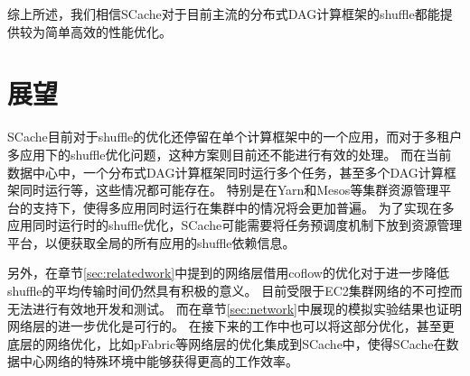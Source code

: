 综上所述，我们相信SCache对于目前主流的分布式DAG计算框架的shuffle都能提供较为简单高效的性能优化。

\section{展望}

SCache目前对于shuffle的优化还停留在单个计算框架中的一个应用，而对于多租户多应用下的shuffle优化问题，这种方案则目前还不能进行有效的处理。
而在当前数据中心中，一个分布式DAG计算框架同时运行多个任务，甚至多个DAG计算框架同时运行等，这些情况都可能存在。
特别是在Yarn\cite{yarn}和Mesos\cite{mesos}等集群资源管理平台的支持下，使得多应用同时运行在集群中的情况将会更加普遍。
为了实现在多应用同时运行时的shuffle优化，SCache可能需要将任务预调度机制下放到资源管理平台，以便获取全局的所有应用的shuffle依赖信息。

另外，在章节\ref{sec:relatedwork}中提到的网络层借用coflow的优化对于进一步降低shuffle的平均传输时间仍然具有积极的意义。
目前受限于EC2集群网络的不可控而无法进行有效地开发和测试。
而在章节\ref{sec:network}中展现的模拟实验结果也证明网络层的进一步优化是可行的。
在接下来的工作中也可以将这部分优化，甚至更底层的网络优化，比如pFabric\cite{pfabric}等网络层的优化集成到SCache中，使得SCache在数据中心网络的特殊环境中能够获得更高的工作效率。


